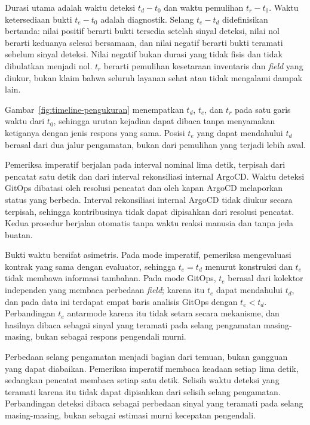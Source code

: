 Durasi utama adalah waktu deteksi $t_d-t_0$ dan waktu pemulihan $t_r-t_0$. Waktu ketersediaan bukti $t_e-t_0$ adalah diagnostik. Selang $t_e-t_d$ didefinisikan bertanda: nilai positif berarti bukti tersedia setelah sinyal deteksi, nilai nol berarti keduanya selesai bersamaan, dan nilai negatif berarti bukti teramati sebelum sinyal deteksi. Nilai negatif bukan durasi yang tidak fisis dan tidak dibulatkan menjadi nol. $t_r$ berarti pemulihan kesetaraan inventaris dan \textit{field} yang diukur, bukan klaim bahwa seluruh layanan sehat atau tidak mengalami dampak lain.



Gambar~\ref{fig:timeline-pengukuran} menempatkan $t_d$, $t_e$, dan $t_r$ pada satu garis waktu dari $t_0$, sehingga urutan kejadian dapat dibaca tanpa menyamakan ketiganya dengan jenis respons yang sama. Posisi $t_e$ yang dapat mendahului $t_d$ berasal dari dua jalur pengamatan, bukan dari pemulihan yang terjadi lebih awal.

Pemeriksa imperatif berjalan pada interval nominal lima detik, terpisah dari pencatat satu detik dan dari interval rekonsiliasi internal ArgoCD. Waktu deteksi GitOps dibatasi oleh resolusi pencatat dan oleh kapan ArgoCD melaporkan status yang berbeda. Interval rekonsiliasi internal ArgoCD tidak diukur secara terpisah, sehingga kontribusinya tidak dapat dipisahkan dari resolusi pencatat. Kedua prosedur berjalan otomatis tanpa waktu reaksi manusia dan tanpa jeda buatan.

Bukti waktu bersifat asimetris. Pada mode imperatif, pemeriksa mengevaluasi kontrak yang sama dengan evaluator, sehingga $t_e=t_d$ menurut konstruksi dan $t_e$ tidak membawa informasi tambahan. Pada mode GitOps, $t_e$ berasal dari kolektor independen yang membaca perbedaan \textit{field}; karena itu $t_e$ dapat mendahului $t_d$, dan pada data ini terdapat empat baris analisis GitOps dengan $t_e<t_d$. Perbandingan $t_e$ antarmode karena itu tidak setara secara mekanisme, dan hasilnya dibaca sebagai sinyal yang teramati pada selang pengamatan masing-masing, bukan sebagai respons pengendali murni.

Perbedaan selang pengamatan menjadi bagian dari temuan, bukan gangguan yang dapat diabaikan. Pemeriksa imperatif membaca keadaan setiap lima detik, sedangkan pencatat membaca setiap satu detik. Selisih waktu deteksi yang teramati karena itu tidak dapat dipisahkan dari selisih selang pengamatan. Perbandingan deteksi dibaca sebagai perbedaan sinyal yang teramati pada selang masing-masing, bukan sebagai estimasi murni kecepatan pengendali.

